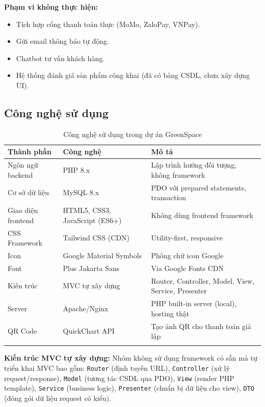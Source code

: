 \documentclass[a4paper]{article}
\begin{document}
\textbf{Phạm vi không thực hiện:}
\begin{itemize}
    \item Tích hợp cổng thanh toán thực (MoMo, ZaloPay, VNPay).
    \item Gửi email thông báo tự động.
    \item Chatbot tư vấn khách hàng.
    \item Hệ thống đánh giá sản phẩm công khai (đã có bảng CSDL, chưa xây dựng UI).
\end{itemize}

\subsection{Công nghệ sử dụng}

\begin{longtable}{|p{4cm}|p{4cm}|p{6.5cm}|}
\hline
\textbf{Thành phần} & \textbf{Công nghệ} & \textbf{Mô tả} \\
\hline
\endhead
Ngôn ngữ backend & PHP 8.x & Lập trình hướng đối tượng, không framework \\
\hline
Cơ sở dữ liệu & MySQL 8.x & PDO với prepared statements, transaction \\
\hline
Giao diện frontend & HTML5, CSS3, JavaScript (ES6+) & Không dùng frontend framework \\
\hline
CSS Framework & Tailwind CSS (CDN) & Utility-first, responsive \\
\hline
Icon & Google Material Symbols & Phông chữ icon Google \\
\hline
Font & Plus Jakarta Sans & Via Google Fonts CDN \\
\hline
Kiến trúc & MVC tự xây dựng & Router, Controller, Model, View, Service, Presenter \\
\hline
Server & Apache/Nginx & PHP built-in server (local), hosting thật \\
\hline
QR Code & QuickChart API & Tạo ảnh QR cho thanh toán giả lập \\
\hline
\caption{Công nghệ sử dụng trong dự án GreenSpace}
\end{longtable}

\textbf{Kiến trúc MVC tự xây dựng:} Nhóm không sử dụng framework có sẵn mà tự triển khai MVC bao gồm: \texttt{Router} (định tuyến URL), \texttt{Controller} (xử lý request/response), \texttt{Model} (tương tác CSDL qua PDO), \texttt{View} (render PHP template), \texttt{Service} (business logic), \texttt{Presenter} (chuẩn bị dữ liệu cho view), \texttt{DTO} (đóng gói dữ liệu request có kiểu).
\end{document}
